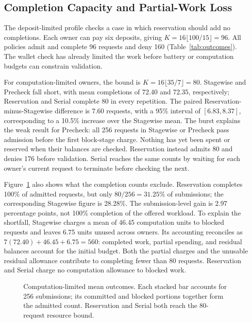 \subsection{Completion Capacity and Partial-Work Loss}

The deposit-limited profile checks a case in which reservation should add
no completions. Each owner can pay six deposits, giving
$K=16\lfloor100/15\rfloor=96$. All policies admit and complete 96 requests
and deny 160 (Table~\ref{tab:outcomes}). The wallet check has already limited
the work before battery or computation budgets can constrain validation.

For computation-limited owners, the bound is $K=16\lfloor35/7\rfloor=80$.
Stagewise and Precheck fall short, with mean completions of 72.40 and 72.35,
respectively; Reservation and Serial complete 80 in every repetition.
The paired Reservation-minus-Stagewise difference is 7.60 requests, with a
95\% interval of $[6.83,8.37]$, corresponding to a 10.5\% increase over
the Stagewise mean. The burst explains the weak result for Precheck:
all 256 requests in Stagewise or Precheck pass admission before the first
block-stage charge. Nothing has yet been spent or reserved when their
balances are checked. Reservation instead admits 80 and denies 176 before
validation. Serial reaches the same counts by waiting for each owner's
current request to terminate before checking the next.

Figure~\ref{fig:outcomes} also shows what the completion counts exclude.
Reservation completes 100\% of admitted requests, but only
$80/256=31.25\%$ of submissions; the corresponding Stagewise figure is
28.28\%. The submission-level gain is 2.97 percentage points, not 100\%
completion of the offered workload. To explain the shortfall, Stagewise
charges a mean of 46.45 computation units to blocked requests and leaves
6.75 units unused across owners. Its accounting reconciles as
$7(72.40)+46.45+6.75=560$: completed work, partial spending, and residual
balances account for the initial budget. Both the partial charges and the
unusable residual allowance contribute to completing fewer than 80 requests.
Reservation and Serial charge no computation allowance to blocked work.

\begin{figure}[t]
\centering

\caption{Computation-limited mean outcomes. Each stacked bar accounts for 256
submissions; its committed and blocked portions together form the admitted
count. Reservation and Serial both reach the 80-request resource bound.}
\label{fig:outcomes}
\end{figure}

